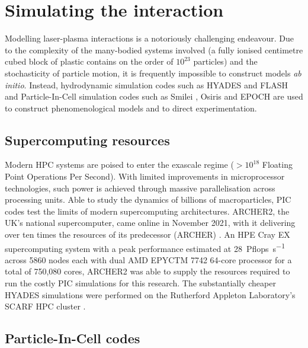 \section{Simulating the interaction}
Modelling laser-plasma interactions is a notoriously challenging endeavour. Due to the complexity of the many-bodied systems involved (a fully ionised centimetre cubed block of plastic contains on the order of $10^23$ particles) and the stochasticity of particle motion, it is frequently impossible to construct models \textit{ab initio}. Instead, hydrodynamic simulation codes such as HYADES \cite{larsenHYADESPlasmaHydrodynamics1994} and FLASH \cite{fryxellFLASHAdaptiveMesh2000} and Particle-In-Cell simulation codes such as Smilei \cite{derouillatSmileiCollaborativeOpensource2018}, Osiris \cite{fonsecaOSIRISThreeDimensionalFully2002} and EPOCH \cite{bennett2017users} are used to construct phenomenological models and to direct experimentation. 

\subsection{Supercomputing resources}\label{sec:intro-archer}
Modern \ac{HPC} systems are poised to enter the exascale regime ($> 10^{18}$ Floating Point Operations Per Second). With limited improvements in microprocessor technologies, such power is achieved through massive parallelisation across processing units. Able to study the dynamics of billions of macroparticles, PIC codes test the limits of modern supercomputing architectures. ARCHER2, the UK's national supercomputer, came online in November 2021, with it delivering over ten times the resources of its predecessor (ARCHER) \cite{ARCHER2}. An HPE Cray EX supercomputing system with a peak performance estimated at \qty{28}{Pflops.s^{-1}} across 5860 nodes each with dual AMD EPYCTM 7742 64-core processor for a total of 750,080 cores, ARCHER2 was able to supply the resources required to run the costly PIC simulations for this research. The substantially cheaper HYADES simulations were performed on the Rutherford Appleton Laboratory's SCARF \ac{HPC} cluster \cite{SCARFOverview}.

\subsection{Particle-In-Cell codes}

